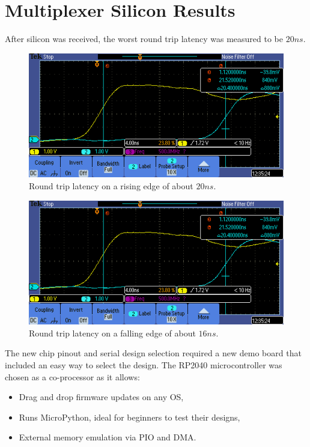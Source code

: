 \section{Multiplexer Silicon Results}
\label{sec:multiplexer_silicon_res}
After silicon was received, the worst round trip latency was measured to be \(20 ns\).

\begin{figure}[htp]
\centering
\includegraphics[width=\columnwidth]{./Figs/tt3p5 rising latency.PNG}
\caption{Round trip latency on a rising edge of about \(20 ns\).}
\label{fig:round_trip_latency_rising_edge}
\end{figure}

\begin{figure}[htp]
\centering
\includegraphics[width=\columnwidth]{./Figs/tt3p5 rising latency.PNG}
\caption{Round trip latency on a falling edge of about \(16 ns\).}
\label{fig:round_trip_latency_falling_edge}
\end{figure}

The new chip pinout and serial design selection required a new demo board that included an easy way to select the design.
The RP2040 microcontroller was chosen as a co-processor as it allows:
\begin{itemize}
\item Drag and drop firmware updates on any OS,
\item Runs MicroPython\cite{micropython}, ideal for beginners to test their designs,
\item External memory emulation via PIO and DMA.
\end{itemize}

